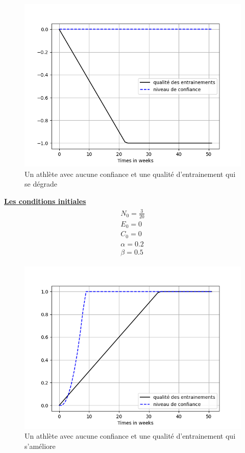 \documentclass[
]{article}
\begin{document}
		\begin{figure}[H]
			\centering
			\includegraphics[width=\textwidth]{Graph5SImu1}
			\caption{Un athlète avec aucune confiance et une qualité d'entrainement qui se dégrade}
			\label{fig:1_5}
		\end{figure}
		
		\underline{\textbf{Les conditions initiales}}
		\begin{align*}
			\boxed{\begin{array}{c} N_0=\frac{3}{20} \\ E_0=0 \\
					C_0=0 \\
					\alpha=0.2 \\
					\beta=0.5
			\end{array}}
		\end{align*}
		
		\begin{figure}[H]
			\centering
			\includegraphics[width=\textwidth]{Graph6SImu1}
			\caption{Un athlète avec aucune confiance et une qualité d'entrainement qui s'améliore}
			\label{fig:1_6}
		\end{figure}
		
\end{document}
